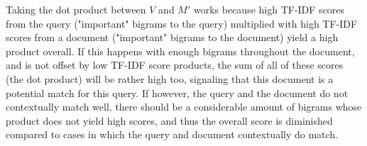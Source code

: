 Taking the dot product between $V$ and $M'$ works because high TF-IDF scores from the query ("important" bigrams to the query)
multiplied with high TF-IDF scores from a document ("important" bigrams to the document) yield a high product overall. If this
happens with enough bigrams throughout the document, and is not offset by low TF-IDF score products, the sum of all of these
scores (the dot product) will be rather high too, signaling that this document is a potential match for this query. If however, the
query and the document do not contextually match well, there should be a considerable amount of bigrams whose product does not
yield high scores, and thus the overall score is diminished compared to cases in which the query and document contextually do match.

